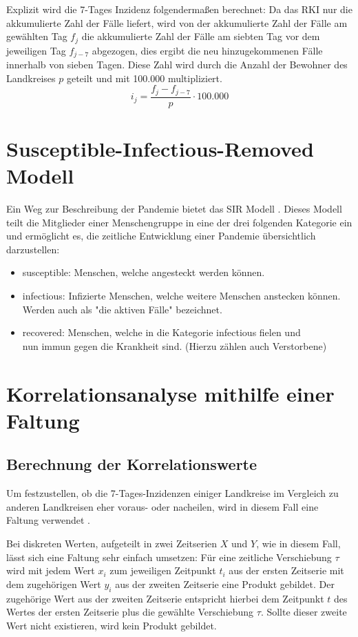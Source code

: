 Explizit wird die 7-Tages Inzidenz folgendermaßen berechnet: Da das RKI nur die akkumulierte Zahl der Fälle liefert, wird von der akkumulierte Zahl der Fälle am gewählten Tag $f_j$ die akkumulierte Zahl der Fälle am siebten Tag vor dem jeweiligen Tag $f_{j-7}$ abgezogen, dies ergibt die neu hinzugekommenen Fälle innerhalb von sieben Tagen.
Diese Zahl wird durch die Anzahl der Bewohner des Landkreises $p$ geteilt und mit 100.000 multipliziert.
\begin{equation}
    i_j= \frac{f_j-f_{j-7}}{p}\cdot 100.000
\end{equation}
\section{Susceptible-Infectious-Removed Modell}
Ein Weg zur Beschreibung der Pandemie bietet das SIR Modell \autocite{SIR}. Dieses Modell teilt die Mitglieder einer Menschengruppe in eine der drei folgenden Kategorie ein und ermöglicht es, die zeitliche Entwicklung einer Pandemie übersichtlich darzustellen:
\begin{itemize}
    \item \glqq{}susceptible\grqq{}: Menschen, welche angesteckt werden können.
    \item \glqq{}infectious\grqq{}: Infizierte Menschen, welche weitere Menschen anstecken können. Werden auch als "die aktiven Fälle" bezeichnet.
    \item \glqq{}recovered\grqq{}: Menschen, welche in die Kategorie \glqq{}infectious\grqq{} fielen und\\
    nun immun gegen die Krankheit sind. (Hierzu zählen auch Verstorbene)
\end{itemize}


\section{Korrelationsanalyse mithilfe einer Faltung}\label{sec:BeschreibungKorrelationsanalyse}
\subsection{Berechnung der Korrelationswerte}\label{Grundlagen:Berechnung der Korrelationwerte}
Um festzustellen, ob die 7-Tages-Inzidenzen einiger Landkreise im Vergleich zu anderen Landkreisen eher voraus- oder nacheilen, wird in diesem Fall eine \glqq{}Faltung\grqq{} verwendet \autocite{Korrelation}.

Bei diskreten Werten, aufgeteilt in zwei Zeitserien $X$ und $Y$, wie in diesem Fall, lässt sich eine Faltung sehr einfach umsetzen:
Für eine zeitliche Verschiebung $\tau$ wird mit jedem Wert $x_i$ zum jeweiligen Zeitpunkt $t_i$ aus der ersten Zeitserie mit dem zugehörigen Wert $y_i$ aus der zweiten Zeitserie eine Produkt gebildet. Der zugehörige Wert aus der zweiten Zeitserie entspricht hierbei dem Zeitpunkt $t$ des Wertes der ersten Zeitserie plus die gewählte Verschiebung $\tau$. Sollte dieser zweite Wert nicht existieren, wird kein Produkt gebildet.

